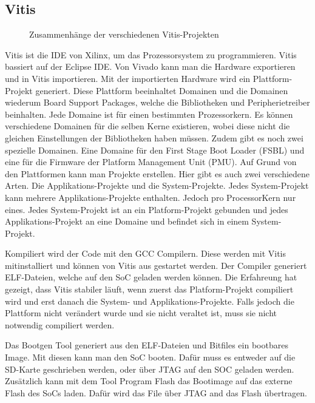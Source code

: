 \documentclass{article}
\begin{document}
\subsection{Vitis}

\begin{figure}[tb]
    \caption{Zusammenhänge der verschiedenen Vitis-Projekten}
    \label{fig:vitis}
\end{figure}

Vitis ist die IDE von Xilinx, um das Prozessorsystem zu programmieren. Vitis bassiert auf der Eclipse IDE. 
Von Vivado kann man die Hardware exportieren und in Vitis importieren. Mit der importierten Hardware wird ein Plattform-Projekt generiert. Diese Plattform beeinhaltet Domainen und die Domainen wiederum Board Support Packages, welche die Bibliotheken und Peripherietreiber beinhalten. Jede Domaine ist für einen bestimmten Prozessorkern. Es können verschiedene Domainen für die selben Kerne existieren, wobei diese nicht die gleichen Einstellungen der Bibliotheken haben müssen. Zudem gibt es noch zwei spezielle Domainen. Eine Domaine für den First Stage Boot Loader (FSBL) und eine für die Firmware der Platform Management Unit (PMU). Auf Grund von den Plattformen kann man Projekte erstellen. Hier gibt es auch zwei verschiedene Arten. Die Applikations-Projekte und die System-Projekte. Jedes System-Projekt kann mehrere Applikations-Projekte enthalten. Jedoch pro ProcessorKern nur eines. Jedes System-Projekt ist an ein Platform-Projekt gebunden und jedes Applikations-Projekt an eine Domaine und befindet sich in einem System-Projekt.

Kompiliert wird der Code mit den GCC Compilern. Diese werden mit Vitis mitinstalliert und können von Vitis aus gestartet werden. Der Compiler generiert ELF-Dateien, welche auf den SoC geladen werden können. Die Erfahreung hat gezeigt, dass Vitis stabiler läuft, wenn zuerst das Platform-Projekt compiliert wird und erst danach die System- und Applikations-Projekte. Falls jedoch die Plattform nicht verändert wurde und sie nicht veraltet ist, muss sie nicht notwendig compiliert werden.

Das Bootgen Tool generiert aus den ELF-Dateien und Bitfiles ein bootbares Image. Mit diesen kann man den SoC booten. Dafür muss es entweder auf die SD-Karte geschrieben werden, oder über JTAG auf den SOC geladen werden. Zusätzlich kann mit dem Tool Program Flash das Bootimage auf das externe Flash des SoCs laden. Dafür wird das File über JTAG and das Flash übertragen.
\end{document}
